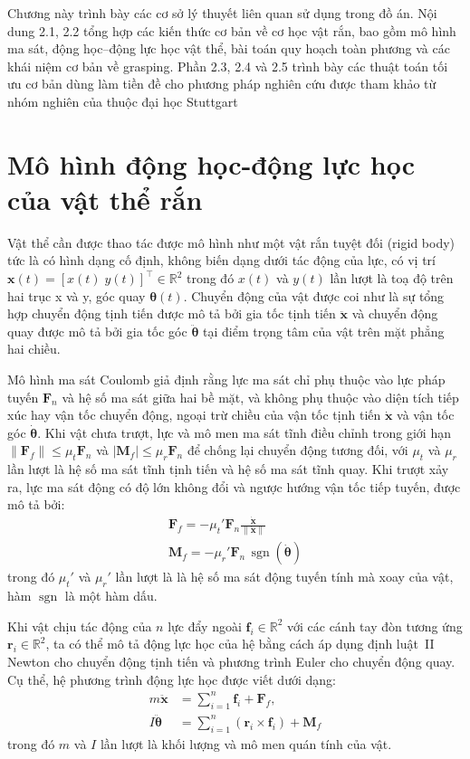 Chương này trình bày các cơ sở lý thuyết liên quan sử dụng trong đồ án. Nội dung 2.1, 2.2 tổng hợp các kiến thức cơ bản về cơ học vật rắn, bao gồm mô hình ma sát, động học–động lực học vật thể, bài toán quy hoạch toàn phương và các khái niệm cơ bản về grasping. Phần 2.3, 2.4 và 2.5 trình bày các thuật toán tối ưu cơ bản dùng làm tiền đề cho phương pháp nghiên cứu được tham khảo từ nhóm nghiên của thuộc đại học Stuttgart \cite{Rosenfelder2024}   

\section{Mô hình động học-động lực học của vật thể rắn}
Vật thể cần được thao tác được mô hình như một vật rắn tuyệt đối (rigid body) tức là có hình dạng cố định, không biến dạng dưới tác động của lực, có vị trí $\mathbf{x}(t) = [x(t)\; y(t)]^{\top} \in \mathbb{R}^2$ trong đó $x(t)$ và $y(t)$ lần lượt là toạ độ trên hai trục x và y, góc quay $\boldsymbol{\theta}(t)$. Chuyển động của vật được coi như là sự tổng hợp chuyển động tịnh tiến được mô tả bởi gia tốc tịnh tiến $\mathbf{\ddot{x}}$ và chuyển động quay được mô tả bởi gia tốc góc $\boldsymbol{\ddot{\theta}}$ tại điểm trọng tâm của vật trên mặt phẳng hai chiều. 

Mô hình ma sát Coulomb giả định rằng lực ma sát chỉ phụ thuộc vào lực pháp tuyến $\mathbf{F}_{n}$ và hệ số ma sát giữa hai bề mặt, và không phụ thuộc vào diện tích tiếp xúc hay vận tốc chuyển động, ngoại trừ chiều của vận tốc tịnh tiến $\dot{\mathbf{x}}$ và vận tốc góc $\boldsymbol{\dot{\theta}}$. Khi vật chưa trượt, lực và mô men ma sát tĩnh điều chỉnh trong giới hạn $\|\mathbf{F}_{f}\|\le \mu_{t} \mathbf{F}_{n}$ và $\left| \mathbf{M}_{f} \right| \le \mu_{r} \mathbf{F}_{n}$ để chống lại chuyển động tương đối, với $\mu_{t}$ và $\mu_{r}$ lần lượt là hệ số ma sát tĩnh tịnh tiến và hệ số ma sát tĩnh quay. Khi trượt xảy ra, lực ma sát động có độ lớn không đổi và ngược hướng vận tốc tiếp tuyến, được mô tả bởi:
\begin{align}
    \mathbf{F}_{f} = -\mu_{t}' \mathbf{F}_{n} \frac{\dot{\mathbf{x}}}{\|\dot{\mathbf{x}}\|}
    \\[6pt]
    \mathbf{M}_{f} = -\mu_{r}' \mathbf{F}_{n}\,\operatorname{sgn}(\boldsymbol{\dot{\theta}})
\end{align}
trong đó $\mu_t'$ và $\mu_r'$ lần lượt là là hệ số ma sát động tuyến tính mà xoay của vật, hàm $\operatorname{sgn}$ là một hàm dấu.

Khi vật chịu tác động của $n$ lực đẩy ngoài $\mathbf{f}_i \in \mathbb{R}^2$ với các cánh tay đòn tương ứng $\mathbf{r}_i \in \mathbb{R}^2$, ta có thể mô tả động lực học của hệ bằng cách áp dụng định luật~II Newton cho chuyển động tịnh tiến và phương trình Euler cho chuyển động quay. Cụ thể, hệ phương trình động lực học được viết dưới dạng:
\begin{align}
    m \ddot{\mathbf{x}} &= \sum_{i=1}^{n} \mathbf{f}_i + \mathbf{F}_{f} ,
    \\[6pt]
    I \boldsymbol{\ddot{\theta}} &= \sum_{i=1}^{n} ( \mathbf{r}_i \times \mathbf{f}_i) + \mathbf{M}_{f}
    \label{eq:ang}
\end{align}
trong đó $m$ và $I$ lần lượt là khối lượng và mô men quán tính của vật.